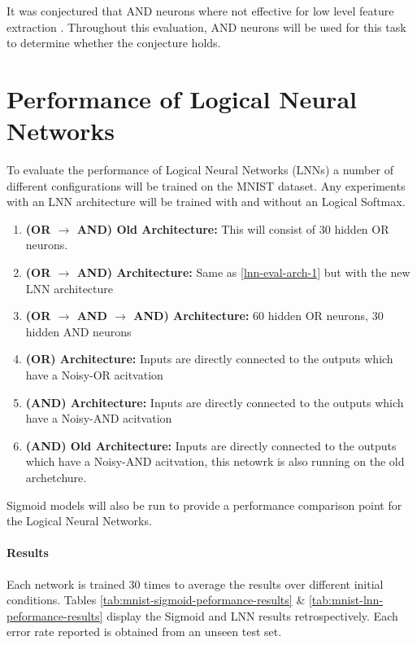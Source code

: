 It was conjectured that AND neurons where not effective for low level feature extraction \cite{LearningLogicalActivations}. Throughout this evaluation, AND neurons will be used for this task to determine whether the conjecture holds.


\section{Performance of Logical Neural Networks} \label{sec:lnn-eval-peformance}
To evaluate the performance of Logical Neural Networks (LNNs) a number of different configurations will be trained on the MNIST dataset. Any experiments with an LNN architecture will be trained with and without an Logical Softmax.

\begin{enumerate}
	\item \textbf{(OR $\rightarrow$ AND) Old Architecture:} This will consist of 30 hidden OR neurons. \label{lnn-eval-arch-1}
	\item \textbf{(OR $\rightarrow$ AND) Architecture:} Same as \ref{lnn-eval-arch-1} but with the new LNN architecture \label{lnn-eval-arch-2}
	\item \textbf{(OR $\rightarrow$ AND $\rightarrow$ AND) Architecture: } 60 hidden OR neurons, 30 hidden AND neurons\label{lnn-eval-arch-4}
	\item \textbf{(OR) Architecture:} Inputs are directly connected to the outputs which have a Noisy-OR acitvation \label{lnn-eval-arch-5}
	\item \textbf{(AND) Architecture:} Inputs are directly connected to the outputs which have a Noisy-AND acitvation\label{lnn-eval-arch-6}
	\item \textbf{(AND) Old Architecture:} Inputs are directly connected to the outputs which have a Noisy-AND acitvation, this netowrk is also running on the old archetchure.\label{lnn-eval-arch-7}
\end{enumerate}

Sigmoid models will also be run to provide a performance comparison point for the Logical Neural Networks.

\paragraph{Results}
Each network is trained 30 times to average the results over different initial conditions. Tables \ref{tab:mnist-sigmoid-peformance-results} \& \ref{tab:mnist-lnn-peformance-results} display the Sigmoid and LNN results retrospectively. Each error rate reported is obtained from an unseen test set.

